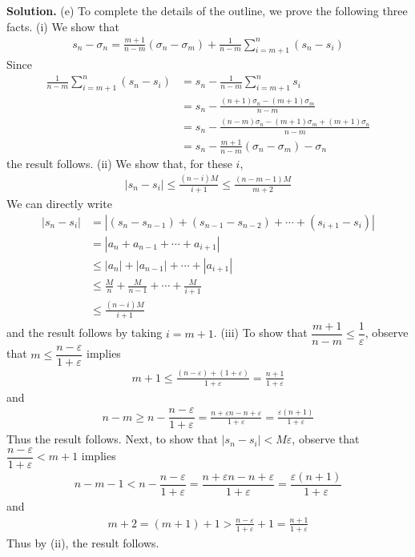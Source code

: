 \documentclass[12pt]{article}
\theoremstyle{definition}
\begin{document}
\smallskip
\noindent\textbf{Solution.}\quad
(e) To complete the details of the outline, we prove the following three facts.
(i) We show that
\begin{align*}
s_n-\sigma_n=\frac{m+1}{n-m}(\sigma_n-\sigma_m)+\frac{1}{n-m}\sum_{i=m+1}^n(s_n-s_i)
\end{align*}
Since
\begin{align*}
\frac{1}{n-m}\sum_{i=m+1}^n(s_n-s_i)
&=s_n-\frac{1}{n-m}\sum_{i=m+1}^ns_i\\
&=s_n-\frac{(n+1)\sigma_n-(m+1)\sigma_m}{n-m}\\
&=s_n-\frac{(n-m)\sigma_n-(m+1)\sigma_m+(m+1)\sigma_n}{n-m}\\
&=s_n-\frac{m+1}{n-m}(\sigma_n-\sigma_m)-\sigma_n
\end{align*}
the result follows.
(ii) We show that, for these $i$,
\begin{align*}
\left\vert s_n-s_i\right\vert\le\frac{(n-i)M}{i+1}\le\frac{(n-m-1)M}{m+2}
\end{align*}
We can directly write
\begin{align*}
\left\vert s_n-s_i\right\vert
&=\left\vert (s_n-s_{n-1})+(s_{n-1}-s_{n-2})+\cdots+(s_{i+1}-s_{i})\right\vert \\
&=\left\vert a_n+a_{n-1}+\cdots+a_{i+1}\right\vert\\
&\le\left\vert a_n\right\vert+\left\vert a_{n-1}\right\vert+\cdots+\left\vert a_{i+1}\right\vert\\
&\le\frac{M}{n}+\frac{M}{n-1}+\cdots+\frac{M}{i+1}\\
&\le\frac{(n-i)M}{i+1}
\end{align*}
and the result follows by taking $i=m+1$.
(iii) To show that $\dfrac{m+1}{n-m}\le\dfrac{1}{\varepsilon}$, observe that $m\le\dfrac{n-\varepsilon}{1+\varepsilon}$ implies
\begin{align*}
m+1
\le \frac{(n-\varepsilon)+(1+\varepsilon)}{1+\varepsilon}
=\frac{n+1}{1+\varepsilon}
\end{align*}
and 
\begin{align*}
n-m
\ge n-\dfrac{n-\varepsilon}{1+\varepsilon}
=\frac{n+\varepsilon n-n+\varepsilon}{1+\varepsilon}
=\frac{\varepsilon (n+1)}{1+\varepsilon}
\end{align*}
Thus the result follows. Next, to show that $\left\vert s_n-s_i\right\vert<M\varepsilon$, observe that $\dfrac{n-\varepsilon}{1+\varepsilon}<m+1$ implies
\begin{align*}
n-m-1
<n-\dfrac{n-\varepsilon}{1+\varepsilon}
=\dfrac{n+\varepsilon n-n+\varepsilon}{1+\varepsilon}
=\dfrac{\varepsilon (n+1)}{1+\varepsilon}
\end{align*}
and
\begin{align*}
m+2=(m+1)+1
>\frac{n-\varepsilon}{1+\varepsilon}+1
=\frac{n+1}{1+\varepsilon}
\end{align*}
Thus by (ii), the result follows.
\end{document}
